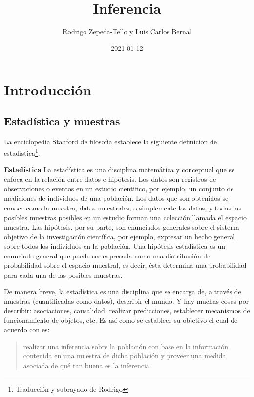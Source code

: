 \documentclass[
]{book}
\title{Inferencia}
\author{Rodrigo Zepeda-Tello y Luis Carlos Bernal}
\date{2021-01-12}
\newenvironment{Definicion}
{\begin{mdframed}[
  linecolor=definicioncolor,
  skipabove=12pt,
  skipbelow=12pt,
  roundcorner=20pt,
  splittopskip=2\topsep]}
{\end{mdframed}}
\begin{document}
\maketitle

{
\setcounter{tocdepth}{1}
\tableofcontents
}
\hypertarget{intro}{%
\chapter{Introducción}\label{intro}}

\hypertarget{estaduxedstica-y-muestras}{%
\section{Estadística y muestras}\label{estaduxedstica-y-muestras}}

La \href{https://plato.stanford.edu/entries/statistics/\#StaInd}{enciclopedia Stanford de filosofía} establece la siguiente definición de estadística\footnote{Traducción y subrayado de Rodrigo}.

\begin{Definicion}
\textbf{Estadística} La estadística es una disciplina matemática y
conceptual que se enfoca en la relación entre datos e hipótesis. Los
datos son registros de observaciones o eventos en un estudio científico,
por ejemplo, un conjunto de mediciones de individuos de una población.
Los datos que son obtenidos se conoce como la muestra, datos muestrales,
o simplemente los datos, y todas las posibles muestras posibles en un
estudio forman una colección llamada el espacio muestra. Las hipótesis,
por su parte, son enunciados generales sobre el sistema objetivo de la
investigación científica, por ejemplo, expresar un hecho general sobre
todos los individuos en la población. Una hipótesis estadística es un
enunciado general que puede ser expresada como una distribución de
probabilidad sobre el espacio muestral, es decir, ésta determina una
probabilidad para cada una de las posibles muestras.
\end{Definicion}

De manera breve, la estadística es una disciplina que se encarga de, a través de muestras (cuantificadas como datos), describir el mundo. Y hay muchas cosas por describir: asociaciones, causalidad, realizar predicciones, establecer mecanismos de funcionamiento de objetos, etc. Es así como se establece su objetivo el cual de acuerdo con \citet{wackerly} es:

\begin{quote}
realizar una inferencia sobre la población con base en la información contenida en una muestra de dicha población y proveer una medida asociada de qué tan buena es la inferencia.
\end{quote}
\end{document}
